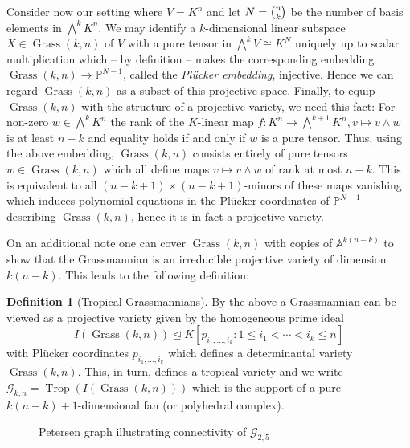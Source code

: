 \documentclass[
  paper=a4,
  titlepage,
  bibliography=totoc,
  pagesize=pdftex
]{scrartcl}
\numberwithin{figure}{section}
\numberwithin{equation}{section}
\numberwithin{table}{section}
\newcommand*\setA{\mathds{A}}
\newcommand*\setP{\mathds{P}}
\let\idealof\trianglelefteq
\DeclareMathOperator{\Trop}{Trop}
\DeclareMathOperator{\Grass}{Grass}
\theoremstyle{definition}
\newtheorem{definition}{Definition}
\numberwithin{definition}{section}
\begin{document}
Consider now our setting where $V=K^n$ and let $N = \smash{\binom nk}$ be the number of
basis elements in $\bigwedge^kK^n$. We may identify a $k$-dimensional linear subspace $X
\in \Grass(k,n)$ of $V$ with a pure tensor in $\bigwedge^kV \cong K^N$ uniquely up to
scalar multiplication which -- by definition -- makes the corresponding embedding
$\Grass(k,n) \to \setP^{N-1}$, called the \emph{Plücker embedding}, injective. Hence we
can regard $\Grass(k,n)$ as a subset of this projective space. Finally, to equip
$\Grass(k,n)$ with the structure of a projective variety, we need this fact: For non-zero
$w\in \bigwedge^kK^n$ the rank of the $K$-linear map $f:K^n \to \bigwedge^{k+1}K^n, v
\mapsto v \wedge w$ is at least $n-k$ and equality holds if and only if $w$ is a pure
tensor. Thus, using the above embedding, $\Grass(k,n)$ consists entirely of pure tensors
$w\in \Grass(k,n)$ which all define maps $v\mapsto v\wedge w$ of rank at most $n-k$. This
is equivalent to all $(n-k+1) \times (n-k+1)$-minors of these maps vanishing which induces
polynomial equations in the Plücker coordinates of $\setP^{N-1}$ describing $\Grass(k,n)$,
hence it is in fact a projective variety.

On an additional note one can cover $\Grass(k,n)$ with copies of $\setA^{k(n-k)}$ to show
that the Grassmannian is an irreducible projective variety of dimension $k(n-k)$. This
leads to the following definition:

\begin{definition}[Tropical Grassmannians]
  By the above a Grassmannian can be viewed as a projective variety given by the
  homogeneous prime ideal
  \[
    I(\Grass(k,n)) \idealof K[ p_{i_1, \dots, i_k} : 1\leq i_1 < \cdots < i_k \leq n ]
  \]
  with Plücker coordinates $p_{i_1,\dots,i_k}$ which defines a determinantal variety
  $\Grass(k, n)$. This, in turn, defines a tropical variety and we write $\mathcal G_{k,n}
  = \Trop(I(\Grass(k,n)))$ which is the support of a pure $k(n-k)+1$-dimensional fan (or
  polyhedral complex).
\end{definition}

\begin{figure}[tbhp]
  \centering
  \caption{Petersen graph illustrating connectivity of $\mathcal G_{2,5}$}
  \label{fig:petersen}
\end{figure}
\end{document}
